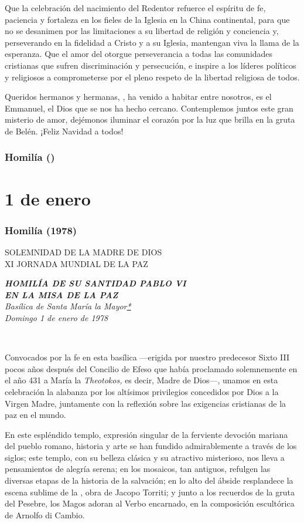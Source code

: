 Que la celebración del nacimiento del Redentor refuerce el espíritu de fe, paciencia y fortaleza en los fieles de la Iglesia en la China continental, para que no se desanimen por las limitaciones a su libertad de religión y conciencia y, perseverando en la fidelidad a Cristo y a su Iglesia, mantengan viva la llama de la esperanza. Que el amor del  otorgue perseverancia a todas las comunidades cristianas que sufren discriminación y persecución, e inspire a los líderes políticos y religiosos a comprometerse por el pleno respeto de la libertad religiosa de todos.

Queridos hermanos y hermanas, , ha venido a habitar entre nosotros, es el Emmanuel, el Dios que se nos ha hecho cercano. Contemplemos juntos este gran misterio de amor, dejémonos iluminar el corazón por la luz que brilla en la gruta de Belén. ¡Feliz Navidad a todos! \subsubsection{Homilía ()}

\section{1 de enero} \subsubsection{Homilía (1978)} SOLEMNIDAD DE LA MADRE DE DIOS\\ XI JORNADA MUNDIAL DE LA PAZ

\emph{\textbf{HOMILÍA DE SU SANTIDAD PABLO VI\\ EN LA MISA DE LA PAZ}\\[2\baselineskip]Basílica de Santa María la Mayor\protect\hyperlink{ux2a}{*}\\ Domingo 1 de enero de 1978}

~

Convocados por la fe en esta basílica ---erigida por nuestro predecesor Sixto III pocos años después del Concilio de Efeso que había proclamado solemnemente en el año 431 a María la \emph{Theotokos,} es decir, Madre de Dios---, unamos en esta celebración la alabanza por los altísimos privilegios concedidos por Dios a la Virgen Madre, juntamente con la reflexión sobre las exigencias cristianas de la paz en el mundo.

En este espléndido templo, expresión singular de la ferviente devoción mariana del pueblo romano, historia y arte se han fundido admirablemente a través de los siglos; este templo, con su belleza clásica y su atractivo misterioso, nos lleva a pensamientos de alegría serena; en los mosaicos, tan antiguos, refulgen las diversas etapas de la historia de la salvación; en lo alto del ábside resplandece la escena sublime de la , obra de Jacopo Torriti; y junto a los recuerdos de la gruta del Pesebre, los Magos adoran al Verbo encarnado, en la composición escultórica de Arnolfo di Cambio.

